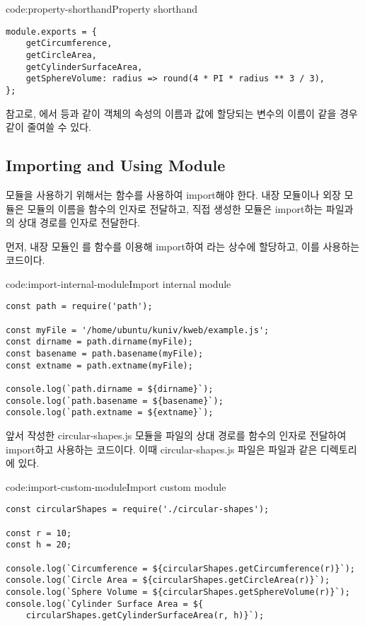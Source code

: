\begin{code}{code:property-shorthand}{Property shorthand}
\begin{verbatim}
module.exports = {
    getCircumference,
    getCircleArea,
    getCylinderSurfaceArea,
    getSphereVolume: radius => round(4 * PI * radius ** 3 / 3),
};
\end{verbatim}
\end{code}

참고로, 에서  등과 같이 객체의 속성의 이름과 값에 할당되는 변수의 이름이 같을 경우 \와 같이 줄여쓸 수 있다.

\subsection*{Importing and Using Module}

모듈을 사용하기 위해서는  함수를 사용하여 import해야 한다. 내장 모듈이나 외장 모듈은 모듈의 이름을  함수의 인자로 전달하고, 직접 생성한 모듈은 import하는 파일과의 상대 경로를 인자로 전달한다.

먼저, \은 내장 모듈인 를  함수를 이용해 import하여 라는 상수에 할당하고, 이를 사용하는 코드이다.

\begin{code}{code:import-internal-module}{Import internal module}
\begin{verbatim}
const path = require('path');

const myFile = '/home/ubuntu/kuniv/kweb/example.js';
const dirname = path.dirname(myFile);
const basename = path.basename(myFile);
const extname = path.extname(myFile);

console.log(`path.dirname = ${dirname}`);
console.log(`path.basename = ${basename}`);
console.log(`path.extname = ${extname}`);
\end{verbatim}
\end{code}

\은 앞서 작성한 circular-shapes.js 모듈을 파일의 상대 경로를  함수의 인자로 전달하여 import하고 사용하는 코드이다. 이때 circular-shapes.js 파일은  파일과 같은 디렉토리에 있다.

\begin{code}{code:import-custom-module}{Import custom module }
\begin{verbatim}
const circularShapes = require('./circular-shapes');

const r = 10;
const h = 20;

console.log(`Circumference = ${circularShapes.getCircumference(r)}`);
console.log(`Circle Area = ${circularShapes.getCircleArea(r)}`);
console.log(`Sphere Volume = ${circularShapes.getSphereVolume(r)}`);
console.log(`Cylinder Surface Area = ${
    circularShapes.getCylinderSurfaceArea(r, h)}`);
\end{verbatim}
\end{code}

